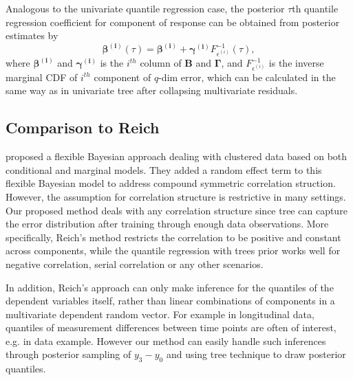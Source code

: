 Analogous to the univariate quantile regression case, the posterior
$\tau$th quantile regression coefficient for component of response can
be obtained from posterior estimates by
\begin{equation}\label{eq:mul}
  \bm{\beta^{(i)}}(\tau) = \bm{\beta^{(i)}} + \bm{\gamma^{(i)}}F^{-1}_{\epsilon^{(i)}}(\tau),
\end{equation}
where $\bm{\beta^{(i)}}$ and $\bm{\gamma^{(i)}}$ is the $i^{th}$
column of $\bm{B}$ and $\bm{\Gamma}$, and $F^{-1}_{\epsilon^{(i)}}$ is
the inverse marginal CDF of $i^{th}$ component of $q$-dim error, which
can be calculated in the same way as in univariate \polya{} tree after
collapsing multivariate residuals.

\subsection{Comparison to Reich}
\citet{reich2010} proposed a flexible Bayesian approach dealing with
clustered data based on both conditional and marginal models. They
added a random effect term to this flexible Bayesian model to address
compound symmetric correlation struction. However, the assumption for
correlation structure is restrictive in many settings. Our proposed
method deals with any correlation structure since \polya{} tree can
capture the error distribution after training through enough data
observations. More specifically, Reich's method restricts the
correlation to be positive and constant across components, while the
quantile regression with \polya{} trees prior works well for negative
correlation, serial correlation or any other scenarios.

In addition, Reich's approach can only make inference for the
quantiles of the dependent variables itself, rather than linear
combinations of components in a multivariate dependent random
vector. For example in longitudinal data, quantiles of measurement
differences between time points are often of interest, e.g. in data
example.  However our method can easily handle such inferences through
posterior sampling of $y_3-y_0$ and using \polya{} tree technique to
draw posterior quantiles.


